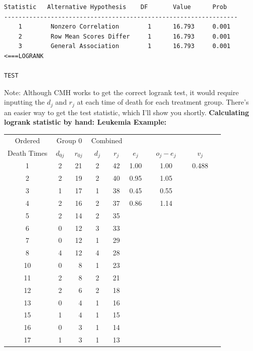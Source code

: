 \documentclass[11pt,slidesonly,semrot,portrait,palatino]{book}
\begin{document}
{\begin{verbatim}
Statistic   Alternative Hypothesis    DF       Value      Prob
-----------------------------------------------------------------
    1        Nonzero Correlation        1      16.793     0.001
    2        Row Mean Scores Differ     1      16.793     0.001
    3        General Association        1      16.793     0.001 <===LOGRANK
                                                                    TEST
\end{verbatim}

\normalsize
Note: Although CMH works to get the correct logrank test, it would
require inputting the $d_j$ and $r_j$ at each time of death
for each treatment group.  There's an easier way to get the
test statistic, which I'll show you shortly.
{\bf Calculating logrank statistic by hand: Leukemia Example:}
\begin{center}
\begin{tabular}{ccccccccc}
\hline
Ordered     & \multicolumn{2}{c}{Group 0} &  \multicolumn{2}{c}{Combined}  \\
\cline{2-3} \cline{4-5}
Death Times & $~d_{0j}~$ & $~r_{0j}~$  & $~d_{j}~$ & $~r_{j}~$ &
     ~$e_j$~ & ~~$o_j-e_j$~~ & ~~$v_j$~~ \\ \hline
  1   &  2    &  21   &    2    &   42  & 1.00 & 1.00 & 0.488\\
  2   &  2    &  19   &    2    &   40  & 0.95 & 1.05 \\
  3   &  1    &  17   &    1    &   38  & 0.45 & 0.55 \\
  4   &  2    &  16   &    2    &   37  & 0.86 & 1.14 \\
  5   &  2    &  14   &    2    &   35  & \\
  6   &  0    &  12   &    3    &   33  & \\
  7   &  0    &  12   &    1    &   29  & \\
  8   &  4    &  12   &    4    &   28  & \\
 10   &  0    &  ~8   &    1    &   23  & \\
 11   &  2    &  ~8   &    2    &   21  & \\
 12   &  2    &  ~6   &    2    &   18  & \\
 13   &  0    &  ~4   &    1    &   16  & \\
 15   &  1    &  ~4   &    1    &   15  & \\
 16   &  0    &  ~3   &    1    &   14  & \\
 17   &  1    &  ~3   &    1    &   13  & \\

\end{tabular}
\end{center}}
\end{document}
